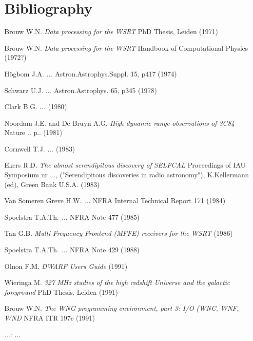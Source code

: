
\chapter{ Bibliography}

\begin{thebibliography}{123}      	%
\bf                                     %


 Brouw W.N.
{\it Data processing for the WSRT}
PhD Thesis, Leiden (1971)

 Brouw W.N.
{\it Data processing for the WSRT}
Handbook of Computational Physics (1972?)

 H\"ogbom J.A. 
{\it ...}
Astron.Astrophys.Suppl. 15, p417 (1974)

 Schwarz U.J.  
{\it ...}
Astron.Astrophys. 65, p345 (1978)

  Clark B.G. 
{\it ...}
(1980)

  Noordam J.E. and De Bruyn A.G. 
{\it High dynamic range observations of 3C84}
Nature .. p.. (1981)

 Cornwell T.J. 
{\it ...}
(1983)

 Ekers R.D. 
{\it The almost serendipitous discovery of SELFCAL}
Proceedings of IAU Symposium nr ...,
({\rm "Serendipitous discoveries in radio astronomy"}),
K.Kellermann (ed), Green Bank U.S.A. (1983)

 Van Someren Greve H.W. 
{\it ...}
NFRA Internal Technical Report 171 (1984)

 Spoelstra T.A.Th. 
{\it ...}
NFRA Note 477 (1985)

 Tan G.B. 
{\it Multi Frequency Frontend (MFFE) receivers for the WSRT}
(1986)

 Spoelstra T.A.Th.
{\it ...}
NFRA Note 429 (1988)

 Olnon F.M. 
{\it DWARF Users Guide}
(1991)


 Wieringa M.
{\it 327 MHz studies of the high redshift Universe and the galactic foreground}
PhD Thesis, Leiden (1991)

 Brouw W.N.
{\it The WNG programming environment, part 3: I/O (WNC, WNF, WND}
NFRA ITR 197c (1991)



  ...:
{\it ...}

\end{thebibliography}

